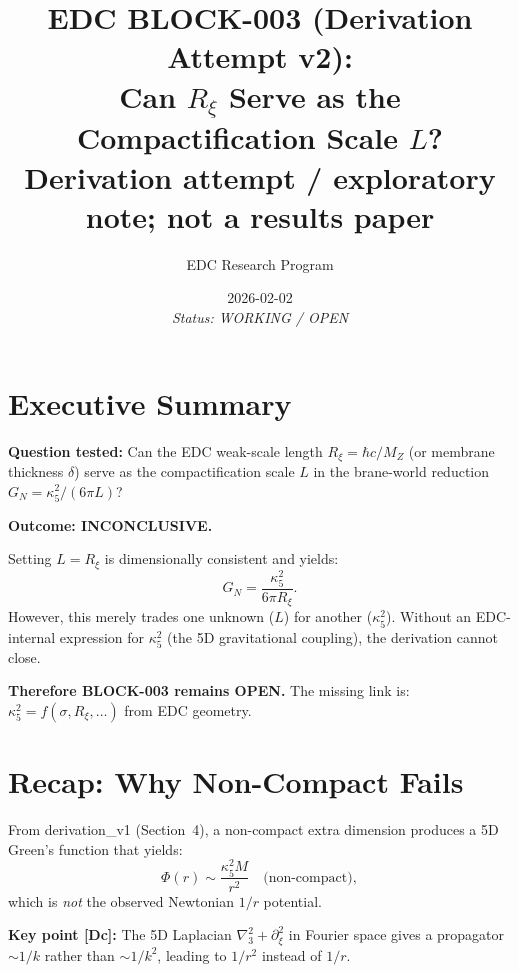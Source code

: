\documentclass[11pt,a4paper]{article}
\title{\textbf{EDC BLOCK-003 (Derivation Attempt v2):}\\[0.3em]
Can $R_\xi$ Serve as the Compactification Scale $L$?\\[0.5em]
\large Derivation attempt / exploratory note; not a results paper}
\author{EDC Research Program}
\date{2026-02-02\\[0.3em]\small\textit{Status: WORKING / OPEN}}
\newcommand{\tagDc}{\textcolor{purple!70!black}{[Dc]}}
\begin{document}
\maketitle

\section{Executive Summary}
\label{sec:summary}

\begin{statusbox}
\textbf{Question tested:} Can the EDC weak-scale length $R_\xi = \hbar c / M_Z$ (or membrane thickness $\delta$) serve as the compactification scale $L$ in the brane-world reduction $G_N = \kappa_5^2 / (6\pi L)$?

\textbf{Outcome: INCONCLUSIVE.}

Setting $L = R_\xi$ is dimensionally consistent and yields:
\begin{equation}
    G_N = \frac{\kappa_5^2}{6\pi R_\xi}.
    \label{eq:GN_Rxi}
\end{equation}
However, this merely trades one unknown ($L$) for another ($\kappa_5^2$).
Without an EDC-internal expression for $\kappa_5^2$ (the 5D gravitational coupling), the derivation cannot close.

\textbf{Therefore BLOCK-003 remains OPEN.}
The missing link is: $\kappa_5^2 = f(\sigma, R_\xi, \ldots)$ from EDC geometry.
\end{statusbox}

\section{Recap: Why Non-Compact Fails}
\label{sec:recap}

From derivation\_v1 (Section~4), a non-compact extra dimension produces a 5D Green's function that yields:
\begin{equation}
    \Phi(r) \sim \frac{\kappa_5^2 M}{r^2} \quad \text{(non-compact)},
\end{equation}
which is \emph{not} the observed Newtonian $1/r$ potential.

\textbf{Key point \tagDc{}:} The 5D Laplacian $\nabla^2_3 + \partial_\xi^2$ in Fourier space gives a propagator $\sim 1/k$ rather than $\sim 1/k^2$, leading to $1/r^2$ instead of $1/r$.
\end{document}
